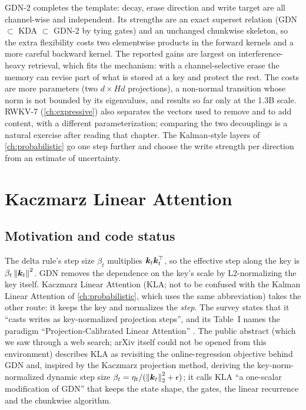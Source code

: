 GDN-2 completes the template: decay, erase direction and write target are all channel-wise and
independent. Its strengths are an exact superset relation (GDN $\subset$ KDA $\subset$ GDN-2 by
tying gates) and an unchanged chunkwise skeleton, so the extra flexibility costs two elementwise
products in the forward kernels and a more careful backward kernel. The reported gains are
largest on interference-heavy retrieval, which fits the mechanism: with a channel-selective erase
the memory can revise part of what is stored at a key and protect the rest. The costs are more
parameters (two $d\times Hd$ projections), a non-normal transition whose norm is not bounded by
its eigenvalues, and results so far only at the 1.3B scale. RWKV-7 (\cref{ch:expressive}) also
separates the vectors used to remove and to add content, with a different parameterization;
comparing the two decouplings is a natural exercise after reading that chapter. The Kalman-style
layers of \cref{ch:probabilistic} go one step further and choose the write strength per direction
from an estimate of uncertainty.

\section{Kaczmarz Linear Attention}\label{sec:c05-kla}

\subsection{Motivation and code status}

The delta rule's step size $\beta_t$ multiplies $\bm{k}_t\bm{k}_t^{\top}$, so the effective step along the
key is $\beta_t\left\lVert \bm{k}_t\right\rVert^2$. GDN removes the dependence on the key's scale by L2-normalizing the
key itself. Kaczmarz Linear Attention (KLA; not to be confused with the Kalman Linear Attention
of \cref{ch:probabilistic}, which uses the same abbreviation) \citep{zou2026kaczmarz} takes the
other route: it
keeps the key and normalizes the \emph{step}. The survey states that it ``casts writes as
key-normalized projection steps'', and its Table~I names the paradigm ``Projection-Calibrated
Linear Attention'' \citep{zhoubian2026memory}. The public abstract (which we saw through a web
search; arXiv itself could not be opened from this environment) describes KLA as
revisiting the online-regression objective behind GDN and, inspired by the Kaczmarz projection
method, deriving the key-norm-normalized dynamic step size
$\beta_t = \eta_t/(\left\lVert \bm{k}_t\right\rVert_2^2 + \epsilon)$; it calls KLA ``a one-scalar modification of
GDN'' that keeps the state shape, the gates, the linear recurrence and the chunkwise algorithm.


